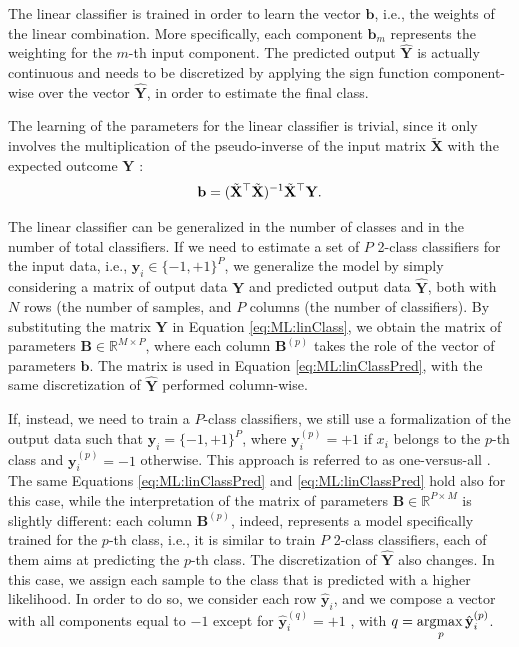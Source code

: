 The linear classifier is trained in order to learn the vector $\mathbf{b}$, i.e., the weights of the linear combination. More specifically, each component $\mathbf{b}_m$ represents the weighting for the $m$-th input component. The predicted output $\hat{\mathbf{Y}}$ is actually continuous and needs to be discretized by applying the sign function component-wise over the vector $\hat{\mathbf{Y}}$, in order to estimate the final class.

The learning of the parameters for the linear classifier is trivial, since it only involves the multiplication of the pseudo-inverse of the input matrix $\tilde{\mathbf{X}}$ with the expected outcome $\mathbf{Y}$ :
\begin{equation}
\mathbf{b}=(\tilde{\mathbf{X}}^\top \tilde{\mathbf{X}})^{-1}  \tilde{\mathbf{X}}^\top  \mathbf{Y}.
\label{eq:ML:linClass}
\end{equation}

The linear classifier can be generalized in the number of classes and in the number of total classifiers. If we need to estimate a set of $P$ 2-class classifiers for the input data, i.e., $ \mathbf{y}_i \in \{-1,+1\}^P$, we generalize the model by simply considering a matrix of
output data $\mathbf{Y}$  and predicted output data $\hat{\mathbf{Y}}$, both with $N$ rows (the number of samples, and $P$ columns (the number of classifiers). By substituting the matrix  $\mathbf{Y}$  in Equation \ref{eq:ML:linClass}, we obtain the matrix of parameters $\mathbf{B}\in\mathbb{R}^{M \times P}$, where each column $\mathbf{B}^{(p)}$ takes the role of the vector of parameters $\mathbf{b}$. The matrix is used in Equation \ref{eq:ML:linClassPred}, with the same discretization of $\hat{\mathbf{Y}}$ performed column-wise.

If, instead, we need to train a $P$-class classifiers, we still use a formalization of the output data such that $ \mathbf{y}_i=\{-1,+1\}^P$, where $ \mathbf{y}_i^{(p)}=+1$ if $x_i$ belongs to the $p$-th class and $ \mathbf{y}_i^{(p)}=-1$ otherwise. This approach is referred to as one-versus-all \cite{Manning2008}. The same Equations \ref{eq:ML:linClassPred} and \ref{eq:ML:linClassPred} hold also for this case, while the interpretation of the matrix of parameters $\mathbf{B}\in \mathbb{R}^{P \times M}$ is slightly different: each column $\mathbf{B}^{(p)}$, indeed, represents a model specifically trained for the $p$-th class, i.e., it is similar to train $P$ 2-class classifiers, each of them aims at predicting the $p$-th class. The discretization of $\hat{\mathbf{Y}}$ also changes. In this case, we assign each  sample to the class that is predicted with a higher likelihood. In order to do so, we consider each row $\hat{\mathbf{y}}_i$, and we compose a vector with all components equal to $-1$ except for $\hat{\mathbf{y}}_i^{(q)}=+1$ , with $q=\underset{p}{\operatorname{argmax}\,} \hat{\mathbf{y}}_i^{(p)}$. 

